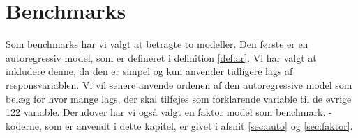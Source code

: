 \chapter{Benchmarks}
Som benchmarks har vi valgt at betragte to modeller. 
Den første er en autoregressiv model, som er defineret i definition \ref{def:ar}.
Vi har valgt at inkludere denne, da den er simpel og kun anvender tidligere lags af responsvariablen.
Vi vil senere anvende ordenen af den autoregressive model som belæg for hvor mange lags, der skal tilføjes som forklarende variable til de øvrige 122 variable. 
Derudover har vi også valgt en faktor model som benchmark.
\Rlang-koderne, som er anvendt i dette kapitel, er givet i afsnit \ref{sec:auto} og \ref{sec:faktor}.







